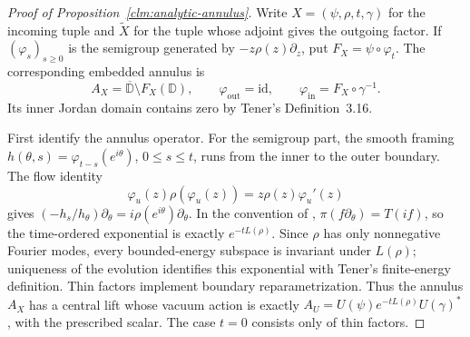 \begin{proof}[Proof of Proposition~\ref{clm:analytic-annulus}]
Write $X=(\psi,\rho,t,\gamma)$ for the incoming tuple and
$\widetilde X$ for the tuple whose adjoint gives the outgoing factor.
If $(\varphi_s)_{s\geq0}$ is the semigroup generated by
$-z\rho(z)\partial_z$, put $F_X=\psi\circ\varphi_t$.
The corresponding embedded annulus is
\[
 A_X=\overline{\mathbb D}\setminus F_X(\mathbb D),
 \qquad \varphi_{\mathrm{out}}=\mathrm{id},\qquad
 \varphi_{\mathrm{in}}=F_X\circ\gamma^{-1}.
\]
Its inner Jordan domain contains zero by Tener's Definition~3.16.

First identify the annulus operator.  For the semigroup part, the
smooth framing $h(\theta,s)=\varphi_{t-s}(e^{i\theta})$, $0\leq s\leq t$,
runs from the inner to the outer boundary.  The flow identity
\[
 \varphi_u(z)\rho(\varphi_u(z))
   =z\rho(z)\varphi_u'(z)
\]
gives $(-h_s/h_\theta)\partial_\theta
=i\rho(e^{i\theta})\partial_\theta$.
In the convention of \cite[Remark~4.2]{HTAnn},
$\pi(f\partial_\theta)=T(if)$, so the time-ordered exponential
\cite[formula~(5.2) and Theorem~5.5]{HTAnn} is exactly
$e^{-tL(\rho)}$.  Since $\rho$ has only nonnegative Fourier modes,
every bounded-energy subspace is invariant under $L(\rho)$; uniqueness
of the evolution identifies this exponential with Tener's
finite-energy definition.  Thin factors implement boundary
reparametrization.  Thus the annulus $A_X$ has a central lift whose
vacuum action is exactly
$A_U=U(\psi)e^{-tL(\rho)}U(\gamma)^*$, with the prescribed scalar.
The case $t=0$ consists only of thin factors.


\end{proof}
